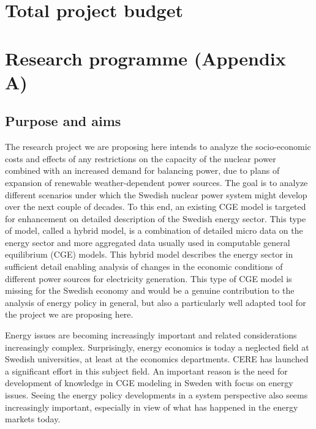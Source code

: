 \documentclass[10pt,a4paper]{article}
\begin{document}
\section{Total project budget}
\section{Research programme (Appendix A)}
\subsection{Purpose and aims}
The research project we are proposing here intends to analyze the socio-economic costs and effects of any restrictions on the capacity of the nuclear power combined with an increased demand for balancing power, due to plans of expansion of renewable weather-dependent power sources. The goal is to analyze different scenarios under which the Swedish nuclear power system might develop over the next couple of decades. To this end, an existing CGE model is targeted for enhancement on detailed description of the Swedish energy sector. This type of model, called a hybrid model, is a combination of detailed micro data on the energy sector and more aggregated data usually used in computable general equilibrium (CGE) models. This hybrid model describes the energy sector in sufficient detail enabling analysis of changes in the economic conditions of different power sources for electricity generation. This type of CGE model is missing for the Swedish economy and would be a genuine contribution to the analysis of energy policy in general, but also a particularly well adapted tool for the project we are proposing here.

Energy issues are becoming increasingly important and related considerations increasingly complex. Surprisingly, energy economics is today a neglected field at Swedish universities, at least at the economics departments. CERE has launched a significant effort in this subject field. An important reason is the need for development of knowledge in CGE modeling in Sweden with focus on energy issues. Seeing the energy policy developments in a system perspective also seems increasingly important, especially in view of what has happened in the energy markets today.
\end{document}
